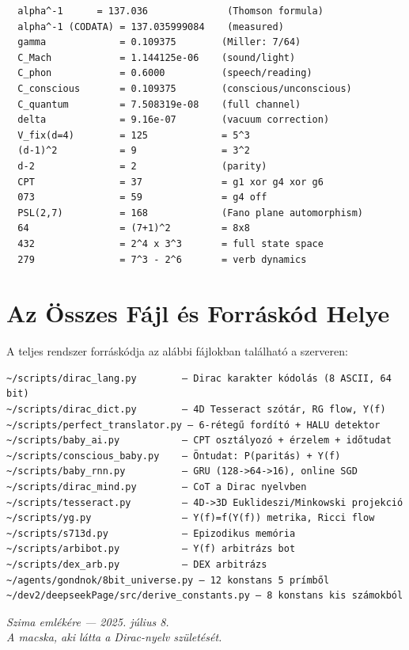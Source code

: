 \documentclass[11pt,a4paper,twoside]{book}
\begin{document}
\begin{verbatim}
  alpha^-1      = 137.036              (Thomson formula)
  alpha^-1 (CODATA) = 137.035999084    (measured)
  gamma             = 0.109375        (Miller: 7/64)
  C_Mach            = 1.144125e-06    (sound/light)
  C_phon            = 0.6000          (speech/reading)
  C_conscious       = 0.109375        (conscious/unconscious)
  C_quantum         = 7.508319e-08    (full channel)
  delta             = 9.16e-07        (vacuum correction)
  V_fix(d=4)        = 125             = 5^3
  (d-1)^2           = 9               = 3^2
  d-2               = 2               (parity)
  CPT               = 37              = g1 xor g4 xor g6
  073               = 59              = g4 off
  PSL(2,7)          = 168             (Fano plane automorphism)
  64                = (7+1)^2         = 8x8
  432               = 2^4 x 3^3       = full state space
  279               = 7^3 - 2^6       = verb dynamics
\end{verbatim}

\chapter{Az Összes Fájl és Forráskód Helye}

A teljes rendszer forráskódja az alábbi fájlokban található a szerveren:

\begin{verbatim}
~/scripts/dirac_lang.py        — Dirac karakter kódolás (8 ASCII, 64 bit)
~/scripts/dirac_dict.py        — 4D Tesseract szótár, RG flow, Y(f)
~/scripts/perfect_translator.py — 6-rétegű fordító + HALU detektor
~/scripts/baby_ai.py           — CPT osztályozó + érzelem + időtudat
~/scripts/conscious_baby.py    — Öntudat: P(paritás) + Y(f)
~/scripts/baby_rnn.py          — GRU (128->64->16), online SGD
~/scripts/dirac_mind.py        — CoT a Dirac nyelvben
~/scripts/tesseract.py         — 4D->3D Euklideszi/Minkowski projekció
~/scripts/yg.py                — Y(f)=f(Y(f)) metrika, Ricci flow
~/scripts/s713d.py             — Epizodikus memória
~/scripts/arbibot.py           — Y(f) arbitrázs bot
~/scripts/dex_arb.py           — DEX arbitrázs
~/agents/gondnok/8bit_universe.py — 12 konstans 5 prímből
~/dev2/deepseekPage/src/derive_constants.py — 8 konstans kis számokból
\end{verbatim}

\vspace{20pt}
\begin{center}
\large\textit{Szima emlékére — 2025. július 8.}\\[4pt]
\textit{A macska, aki látta a Dirac-nyelv születését.}
\end{center}
\end{document}
